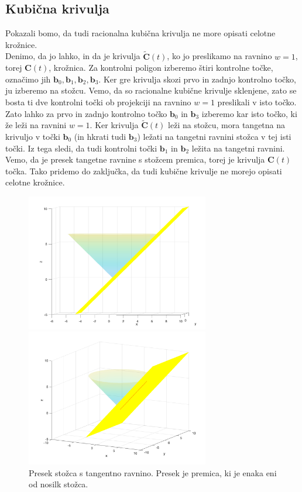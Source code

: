 \documentclass[a4paper,11pt]{article}
\theoremstyle{definition}
\theoremstyle{plain}
\begin{document}
\subsection{Kubična krivulja}
Pokazali bomo, da tudi racionalna kubična krivulja ne more opisati celotne krožnice. \\
Denimo, da jo lahko, in da je krivulja $\boldsymbol{\tilde{C}}(t)$, ko jo preslikamo na ravnino $w = 1$, torej $\boldsymbol{C}(t)$, krožnica.
Za kontrolni poligon izberemo štiri kontrolne točke, označimo jih $\boldsymbol{b}_0, \boldsymbol{b}_1, \boldsymbol{b}_2, \boldsymbol{b}_3$. Ker gre krivulja skozi prvo in zadnjo kontrolno točko, ju izberemo na stožcu.
Vemo, da so racionalne kubične krivulje sklenjene, zato se bosta ti dve kontrolni točki ob projekciji na ravnino $w = 1$ preslikali v isto točko. 
Zato lahko za prvo in zadnjo kontrolno točko $\boldsymbol{b}_0$ in $\boldsymbol{b}_3$ izberemo kar isto točko, ki že leži na ravnini $w = 1$. 
Ker krivulja $\boldsymbol{\tilde{C}}(t)$ leži na stožcu, mora tangetna na krivuljo v točki $\boldsymbol{b}_0$ (in hkrati tudi $\boldsymbol{b}_3$) ležati na tangetni ravnini stožca v tej isti točki.
Iz tega sledi, da tudi kontrolni točki $\boldsymbol{b}_1$ in $\boldsymbol{b}_2$ ležita na tangetni ravnini. Vemo, da je presek tangetne ravnine s stožcem premica, torej je krivulja $\boldsymbol{C}(t)$ točka.
Tako pridemo do zaključka, da tudi kubične krivulje ne morejo opisati celotne krožnice.
\begin{figure}[ht!]
    \begin{minipage}{0.5\textwidth}
        \centering
        \includegraphics[width=80mm]{stozec_tang_1.png}
    \end{minipage}\hfill
    \begin{minipage}{0.5\textwidth}
        \centering
        \includegraphics[width=80mm]{stozec_tang_2.png}
    \end{minipage}\hfill
    \caption{Presek stožca s tangentno ravnino. Presek je premica, ki je enaka eni od nosilk stožca.}
\end{figure}
\end{document}
